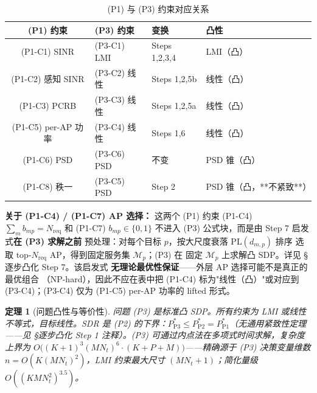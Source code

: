 \documentclass[12pt,a4paper]{article}
\newtheorem{theorem}{定理}
\begin{document}
\begin{table}[htbp]
\centering
\caption{(P1) 与 (P3) 约束对应关系}
\begin{tabular}{clll}
\toprule
(P1) 约束 & (P3) 约束 & 变换 & 凸性 \\
\midrule
(P1-C1) SINR & (P3-C1) LMI & Steps 1,2,3,4 & LMI（凸） \\
(P1-C2) 感知 SINR & (P3-C2) 线性 & Steps 1,2,5b & 线性（凸） \\
(P1-C3) PCRB & (P3-C3) 线性 & Steps 1,2,5a & 线性（凸） \\
(P1-C5) per-AP 功率 & (P3-C4) 线性 & Steps 1,6 & 线性（凸） \\
(P1-C6) PSD & (P3-C6) PSD & 不变 & PSD 锥（凸） \\
(P1-C8) 秩一 & (P3-C5) PSD & Step 2 & PSD 锥（凸，**不紧致**）\\
\bottomrule
\end{tabular}
\end{table}

\textbf{关于 (P1-C4) / (P1-C7) AP 选择：} 这两个 (P1) 约束
(P1-C4) $\sum_m b_{mp} = N_{\text{req}}$ 和 (P1-C7) $b_{mp} \in \{0,1\}$
不进入 (P3) 公式块，而是由 Step 7 启发式\textbf{在 (P3) 求解之前}
预处理：对每个目标 $p$，按大尺度衰落 $\text{PL}(d_{m,p})$ 排序
选取 top-$N_{\text{req}}$ AP，得到固定服务集 $\mathcal{M}_p$；(P3) 在
固定 $\mathcal{M}_p$ 上求解凸 SDP。详见 §逐步凸化 Step 7。该启发式
\textbf{无理论最优性保证}——外层 AP 选择可能不是真正的最优组合
（NP-hard），因此不应在表中把 (P1-C4) 标为"线性（凸）"或对应到
(P3-C4)；(P3-C4) 仅为 (P1-C5) per-AP 功率的 lifted 形式。

\begin{theorem}[问题凸性与等价性]
问题 (P3) 是标准凸 SDP。所有约束为 LMI 或线性不等式，目标线性。SDR 是 (P2) 的下界：$P_{\text{P3}}^* \leq P_{\text{P2}}^* = P_{\text{P1}}^*$（无通用紧致性定理——见 §逐步凸化 Step 1 注释）。(P3) 可通过内点法在多项式时间求解，复杂度上界为 $O\big((K+1)^3 (MN_t)^6 \cdot (K+P+M)\big)$——精确源于 (P3) 决策变量维数 $n = O(K (MN_t)^2)$，LMI 约束最大尺寸 $(MN_t+1)$；简化量级 $O((K M N_t^2)^{3.5})$。
\end{theorem}
\end{document}
